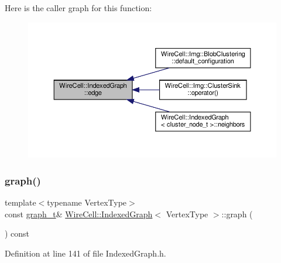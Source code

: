 Here is the caller graph for this function\+:
\nopagebreak
\begin{figure}[H]
\begin{center}
\leavevmode
\includegraphics[width=350pt]{class_wire_cell_1_1_indexed_graph_a03a0f192232d913bfb4171fc7b2e095a_icgraph}
\end{center}
\end{figure}
\mbox{\label{class_wire_cell_1_1_indexed_graph_a73e33d19b8b03611097aa02a2e72dd1d}} 
\subsubsection{\texorpdfstring{graph()}{graph()}\hspace{0.1cm}{\footnotesize\ttfamily [1/2]}}
{\footnotesize\ttfamily template$<$typename Vertex\+Type$>$ \\
const \hyperlink{class_wire_cell_1_1_indexed_graph_a5593f08e4be84de33ebf37de7d071819}{graph\+\_\+t}\& \hyperlink{class_wire_cell_1_1_indexed_graph}{Wire\+Cell\+::\+Indexed\+Graph}$<$ Vertex\+Type $>$\+::graph (\begin{DoxyParamCaption}{ }\end{DoxyParamCaption}) const\hspace{0.3cm}{\ttfamily [inline]}}



Definition at line 141 of file Indexed\+Graph.\+h.

